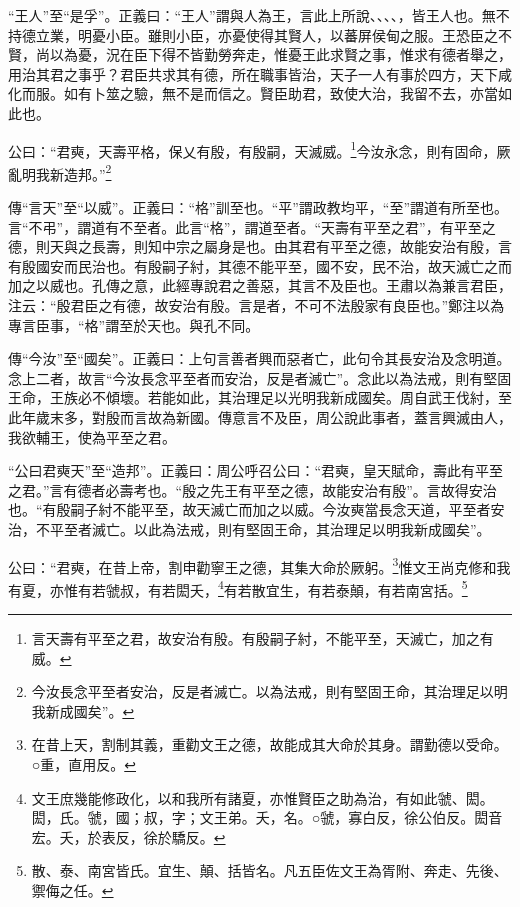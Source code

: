 {\noindent\shu{}\fzkt “王人”至“是孚”。正義曰：“王人”謂與人為王，言此上所說、、、、，皆王人也。無不持德立業，明憂小臣。雖則小臣，亦憂使得其賢人，以蕃屏侯甸之服。王恐臣之不賢，尚以為憂，況在臣下得不皆勤勞奔走，惟憂王此求賢之事，惟求有德者舉之，用治其君之事乎？君臣共求其有德，所在職事皆治，天子一人有事於四方，天下咸化而服。如有卜筮之驗，無不是而信之。賢臣助君，致使大治，我留不去，亦當如此也。 \par}

公曰：“君奭，天壽平格，保乂有殷，有殷嗣，天滅威。\footnote{言天壽有平至之君，故安治有殷。有殷嗣子紂，不能平至，天滅亡，加之有威。}今汝永念，則有固命，厥亂明我新造邦。”\footnote{今汝長念平至者安治，反是者滅亡。以為法戒，則有堅固王命，其治理足以明我新成國矣”。}


{\noindent\zhuan{}\fzbyks 傳“言天”至“以威”。正義曰：“格”訓至也。“平”謂政教均平，“至”謂道有所至也。言“不弔”，謂道有不至者。此言“格”，謂道至者。“天壽有平至之君”，有平至之德，則天與之長壽，則知中宗之屬身是也。由其君有平至之德，故能安治有殷，言有殷國安而民治也。有殷嗣子紂，其德不能平至，國不安，民不治，故天滅亡之而加之以威也。孔傳之意，此經專說君之善惡，其言不及臣也。王肅以為兼言君臣，注云：“殷君臣之有德，故安治有殷。言是者，不可不法殷家有良臣也。”鄭注以為專言臣事，“格”謂至於天也。與孔不同。 \par}

{\noindent\zhuan{}\fzbyks 傳“今汝”至“國矣”。正義曰：上句言善者興而惡者亡，此句令其長安治及念明道。念上二者，故言“今汝長念平至者而安治，反是者滅亡”。念此以為法戒，則有堅固王命，王族必不傾壞。若能如此，其治理足以光明我新成國矣。周自武王伐紂，至此年歲末多，對殷而言故為新國。傳意言不及臣，周公說此事者，蓋言興滅由人，我欲輔王，使為平至之君。 \par}

{\noindent\shu{}\fzkt “公曰君奭天”至“造邦”。正義曰：周公呼召公曰：“君奭，皇天賦命，壽此有平至之君。”言有德者必壽考也。“殷之先王有平至之德，故能安治有殷”。言故得安治也。“有殷嗣子紂不能平至，故天滅亡而加之以威。今汝奭當長念天道，平至者安治，不平至者滅亡。以此為法戒，則有堅固王命，其治理足以明我新成國矣”。 \par}

公曰：“君奭，在昔上帝，割申勸寧王之德，其集大命於厥躬。\footnote{在昔上天，割制其義，重勸文王之德，故能成其大命於其身。謂勤德以受命。○重，直用反。}惟文王尚克修和我有夏，亦惟有若虢叔，有若閎夭，\footnote{文王庶幾能修政化，以和我所有諸夏，亦惟賢臣之助為治，有如此虢、閎。閎，氏。虢，國；叔，字；文王弟。夭，名。○虢，寡白反，徐公伯反。閎音宏。夭，於表反，徐於驕反。}有若散宜生，有若泰顛，有若南宮括。\footnote{散、泰、南宮皆氏。宜生、顛、括皆名。凡五臣佐文王為胥附、奔走、先後、禦侮之任。}


